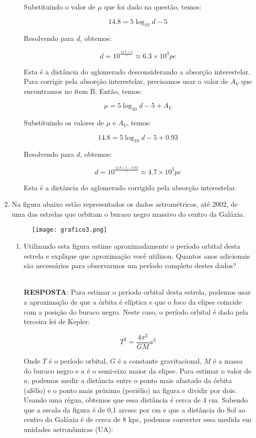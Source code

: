 \documentclass[a4paper,12pt]{article}
\begin{document}
\begin{enumerate}
\begin{enumerate}
Substituindo o valor de $\mu$ que foi dado na questão, temos:

$$14.8 = 5 \log_{10} d - 5$$

Resolvendo para $d$, obtemos:

$$d = 10^{\frac{14.8 + 5}{5}} \approx 6.3 \times 10^3 pc$$

Esta é a distância do aglomerado desconsiderando a absorção interestelar. Para corrigir pela absorção interestelar, precisamos usar o valor de $A_V$ que encontramos no item B. Então, temos:

$$\mu = 5 \log_{10} d - 5 + A_V$$

Substituindo os valores de $\mu$ e $A_V$, temos:

$$14.8 = 5 \log_{10} d - 5 + 0.93$$

Resolvendo para $d$, obtemos:

$$d = 10^{\frac{14.8 + 5 - 0.93}{5}} \approx 4.7 \times 10^3 pc$$

Esta é a distância do aglomerado corrigida pela absorção interestelar.

\end{enumerate}

\noindent\hrulefill

\item Na figura abaixo estão representados os dados astrométricos, até 2002, de uma das estrelas que orbitam o buraco negro massivo do centro da Galáxia.

\begin{figure}[H]
    \centering
    \texttt{[image: grafico3.png]}
\end{figure}

\begin{enumerate}
\item Utilizando esta figura estime aproximadamente o período orbital desta estrela e explique que aproximação você utilizou. Quantos anos adicionais são necessários para observarmos um período completo destes dados?

\noindent\hrulefill\\\textbf{RESPOSTA}: Para estimar o período orbital desta estrela, podemos usar a aproximação de que a órbita é elíptica e que o foco da elipse coincide com a posição do buraco negro. Neste caso, o período orbital é dado pela terceira lei de Kepler:

$$T^2 = \frac{4\pi^2}{GM}a^3$$

Onde $T$ é o período orbital, $G$ é a constante gravitacional, $M$ é a massa do buraco negro e $a$ é o semi-eixo maior da elipse. Para estimar o valor de $a$, podemos medir a distância entre o ponto mais afastado da órbita (afélio) e o ponto mais próximo (periélio) na figura e dividir por dois. Usando uma régua, obtemos que essa distância é cerca de 4 cm. Sabendo que a escala da figura é de 0,1 arcsec por cm e que a distância do Sol ao centro da Galáxia é de cerca de 8 kpc, podemos converter essa medida em unidades astronômicas (UA):


\end{enumerate}
\end{enumerate}
\end{document}
